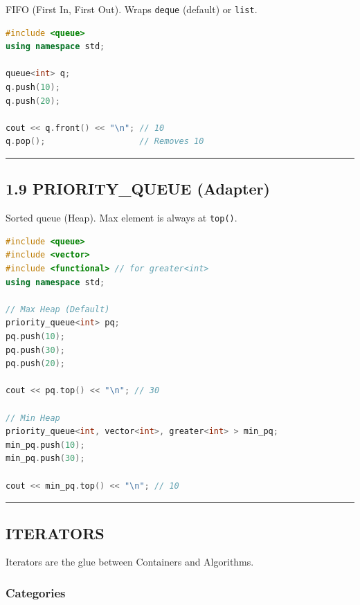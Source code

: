 FIFO (First In, First Out). Wraps \passthrough{\lstinline!deque!}
(default) or \passthrough{\lstinline!list!}.

\begin{lstlisting}[language={C++}]
#include <queue>
using namespace std;

queue<int> q;
q.push(10);
q.push(20);

cout << q.front() << "\n"; // 10
q.pop();                   // Removes 10
\end{lstlisting}

\begin{center}\rule{0.5\linewidth}{0.5pt}\end{center}

\hypertarget{priority_queue-adapter}{%
\subsection{1.9 PRIORITY\_QUEUE
(Adapter)}\label{priority_queue-adapter}}

Sorted queue (Heap). Max element is always at
\passthrough{\lstinline!top()!}.

\begin{lstlisting}[language={C++}]
#include <queue>
#include <vector>
#include <functional> // for greater<int>
using namespace std;

// Max Heap (Default)
priority_queue<int> pq;
pq.push(10);
pq.push(30);
pq.push(20);

cout << pq.top() << "\n"; // 30

// Min Heap
priority_queue<int, vector<int>, greater<int> > min_pq;
min_pq.push(10);
min_pq.push(30);

cout << min_pq.top() << "\n"; // 10
\end{lstlisting}

\begin{center}\rule{0.5\linewidth}{0.5pt}\end{center}

\hypertarget{iterators}{%
\subsection{ITERATORS}\label{iterators}}

Iterators are the glue between Containers and Algorithms.

\hypertarget{categories}{%
\subsubsection{Categories}\label{categories}}

